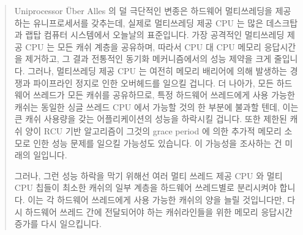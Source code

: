 \begin{quote}
	Uniprocessor \"Uber Alles 의 덜 극단적인 변종은 하드웨어 멀티쓰레딩을
	제공하는 유니프로세서를 갖추는데, 실제로 멀티쓰레딩 제공 CPU 는 많은
	데스크탑과 랩탑 컴퓨터 시스템에서 오늘날의 표준입니다.
	가장 공격적인 멀티쓰레딩 제공 CPU 는 모든 캐쉬 계층을 공유하며, 따라서
	CPU 대 CPU 메모리 응답시간을 제거하고, 그 결과 전통적인 동기화
	메커니즘에서의 성능 제약을 크게 줄입니다.
	그러나, 멀티쓰레딩 제공 CPU 는 여전히 메모리 배리어에 의해 발생하는
	경쟁과 파이프라인 정지로 인한 오버헤드를 일으킬 겁니다.
	더 나아가, 모든 하드웨어 쓰레드가 모든 캐쉬를 공유하므로, 특정 하드웨어
	쓰레드에게 사용 가능한 캐쉬는 동일한 싱글 쓰레드 CPU 에서 가능할 것의
	한 부분에 불과할 텐데, 이는 큰 캐쉬 사용량을 갖는 어플리케이션의 성능을
	하락시킬 겁니다.
	또한 제한된 캐쉬 양이 RCU 기반 알고리즘이 그것의 grace period 에 의한
	추가적 메모리 소모로 인한 성능 문제를 일으킬 가능성도 있습니다.
	이 가능성을 조사하는 건 미래의 일입니다.

	그러나, 그런 성능 하락을 막기 위해선 여러 멀티 쓰레드 제공 CPU 와 멀티
	CPU 칩들이 최소한 캐쉬의 일부 계층을 하드웨어 쓰레드별로 분리시켜야
	합니다.
	이는 각 하드웨어 쓰레드에게 사용 가능한 캐쉬의 양을 늘릴 것입니다만,
	다시 하드웨어 쓰레드 간에 전달되어야 하는 캐쉬라인들을 위한 메모리
	응답시간 증가를 다시 일으킵니다.

\end{quote}

